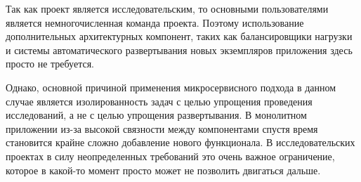 Так как проект является исследовательским, то основными пользователями является немногочисленная команда проекта.
Поэтому использование дополнительных архитектурных компонент,
таких как балансировщики нагрузки и системы автоматического развертывания новых экземпляров приложения
здесь просто не требуется.

Однако, основной причиной применения микросервисного подхода в данном случае является изолированность задач с целью
упрощения проведения исследований, а не с целью упрощения развертывания.
В монолитном приложении из-за высокой связности между компонентами спустя время становится крайне сложно добавление
нового функционала. В исследовательских проектах в силу неопределенных требований это очень важное ограничение,
которое в какой-то момент просто может не позволить двигаться дальше.
